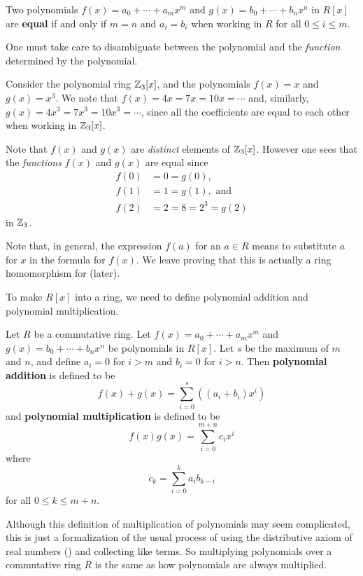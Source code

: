 \begin{definition}
    Two polynomials $f(x) = a_0 + \cdots + a_mx^m$ and $g(x) = b_0 + \cdots + b_nx^n$ in $R[x]$ are \textbf{equal} if and only if $m = n$ and $a_i = b_i$ when working in $R$ for all $0 \leq i \leq m$.
\end{definition}

One must take care to disambiguate between the polynomial and the \textit{function} determined by the polynomial.
\begin{example}
    Consider the polynomial ring $\mathbb{Z}_3[x]$, and the polynomials $f(x) = x$ and $g(x) = x^3$. We note that $f(x) = 4x = 7x = 10x = \cdots$ and, similarly, $g(x) = 4x^3 = 7x^3 = 10x^3 = \cdots$, since all the coefficients are equal to each other when working in $\mathbb{Z}_3[x]$.
    
    Note that $f(x)$ and $g(x)$ are \textit{distinct} elements of $\mathbb{Z}_3[x]$. However one sees that the \textit{functions} $f(x)$ and $g(x)$ are equal since
    \begin{align*}
        f(0) &= 0 = g(0),\\
        f(1) &= 1 = g(1), \text{ and }\\
        f(2) &= 2 = 8 = 2^3 = g(2)
    \end{align*}
    in $\mathbb{Z}_3$.
\end{example}

Note that, in general, the expression $f(a)$ for an $a \in R$ means to substitute $a$ for $x$ in the formula for $f(x)$. We leave proving that this is actually a ring homomorphism for  (later).

To make $R[x]$ into a ring, we need to define polynomial addition and polynomial multiplication.
\begin{definition}
    Let $R$ be a commutative ring. Let $f(x) = a_0 + \cdots + a_mx^m$ and $g(x) = b_0 + \cdots + b_nx^n$ be polynomials in $R[x]$. Let $s$ be the maximum of $m$ and $n$, and define $a_i = 0$ for $i > m$ and $b_i = 0$ for $i > n$. Then \textbf{polynomial addition} is defined to be
    \[
        f(x)+g(x) = \sum_{i=0}^s\left((a_i+b_i)x^i\right)
    \]
    and \textbf{polynomial multiplication} is defined to be
    \[
        f(x)g(x) = \sum_{i=0}^{m+n}c_ix^i
    \]
    where
    \[
        c_k = \sum_{i=0}^k a_ib_{k-i}
    \]
    for all $0 \leq k \leq m + n$.
\end{definition}
Although this definition of multiplication of polynomials may seem complicated, this is just a formalization of the usual process of using the distributive axiom of real numbers () and collecting like terms. So multiplying polynomials over a commutative ring $R$ is the same as how polynomials are always multiplied.

